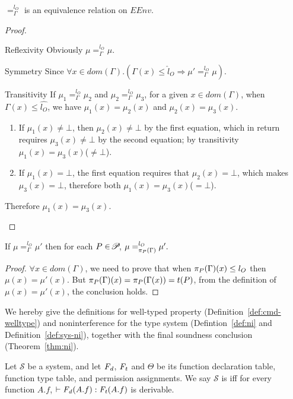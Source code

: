 {{{\begin{lemma}\label{lem:ni-eq}
$=_{\Gamma}^{l_{O}}$ is an equivalence relation on $EEnv$.
\end{lemma}
 \begin{proof}
\begin{ProofEnumDesc}[style=standard]
	\item [Reflexivity] Obviously $\mu=_{\Gamma}^{l_O}\mu$.
	\item [Symmetry] Since $\forall x\in dom(\Gamma). (\Gamma(x)\leq\hat{l}_O\Rightarrow\mu'=_{\Gamma}^{l_O}\mu)$.
	\item [Transitivity] If $\mu_1=_{\Gamma}^{l_O}\mu_2$ and $\mu_2=_{\Gamma}^{l_O}\mu_3$, for a given $x\in dom(\Gamma)$, when $\Gamma(x)\leq\hat{l_O}$, we have $\mu_1(x)=\mu_2(x)$ and $\mu_2(x)=\mu_3(x)$.
	\begin{enumerate}[label={(\arabic*)}]
	\item If $\mu_1(x)\neq\bot$, then $\mu_2(x)\neq\bot$ by the first equation, which in return requires $\mu_3(x)\neq\bot$ by the second equation; by transitivity $\mu_1(x)=\mu_3(x)$($\neq\bot$).
	\item If $\mu_1(x)=\bot$, the first equation requires that $\mu_2(x)=\bot$, which makes $\mu_3(x)=\bot$, therefore both $\mu_1(x)=\mu_3(x)$($=\bot$).
	\end{enumerate}
	Therefore $\mu_1(x)=\mu_3(x)$.
\end{ProofEnumDesc}
 \end{proof}

 \begin{lemma}\label{lem:proj}
If $\mu =_{\Gamma}^{l_{O}} \mu'$
then for each $P\in\PPS$,
$\mu =_{\app{\Gamma}{P}}^{l_O} \mu'.$
\end{lemma}
 \begin{proof}
$\forall x\in dom(\Gamma)$, we need to prove that when $\app{\Gamma}{P}(x)\leq l_O$ then $\mu(x)=\mu'(x)$. But $\app{\Gamma}{P}(x)=\app{\Gamma(x)}{P}=t(P)$, from the definition of $\mu(x)=\mu'(x)$, the conclusion holds.
 \end{proof}



We hereby give the definitions for well-typed property
(Definition~\ref{def:cmd-welltype}) and noninterference for the type
system (Defintion~\ref{def:ni} and Definition~\ref{def:sys-ni}),
together with the final soundness conclusion
(Theorem~\ref{thm:ni}).


\begin{definition}\label{def:cmd-welltype}
Let $\mathcal{S}$ be a system, and let $\FD$, $\FT$ and $\Theta$ be
its function declaration table, function type table, and permission
assignments. We say $\mathcal{S}$ is  iff for
every function $A.f$, $\vdash \FD(A.f) : \FT(A.f)$ is derivable.
\end{definition}


}}}
